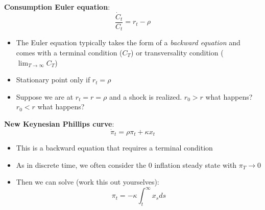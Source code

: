 \documentclass[10pt]{beamer}
\begin{document}
\begin{frame}{}
	\textbf{Consumption Euler equation}:
	\begin{equation*}
		\frac{\dot C_t}{C_t} = r_t - \rho
	\end{equation*}
	\begin{itemize}
		\item The Euler equation typically takes the form of a \textit{backward equation} and comes with a terminal condition ($C_T$) or transversality condition ($\lim_{T\to\infty} C_T$)
		
		\item Stationary point only if $r_t = \rho$
		
		\item Suppose we are at $r_t = r = \rho$ and a shock is realized. $r_0 > r$ what happens? $r_0 < r$ what happens? 
	\end{itemize}
\end{frame}



\begin{frame}{}
	\textbf{New Keynesian Phillips curve}:
	\begin{equation*}
		\dot \pi_t = \rho \pi_t + \kappa x_t
	\end{equation*}
	\begin{itemize}
		\item This is a backward equation that requires a terminal condition
		
		\item As in discrete time, we often consider the $0$ inflation steady state with $\pi_T \to 0$
		
		\item Then we can solve (work this out yourselves):
		\begin{equation*}
			\pi_t = - \kappa \int_t^\infty x_s ds
		\end{equation*}
	\end{itemize}
\end{frame}
\end{document}
